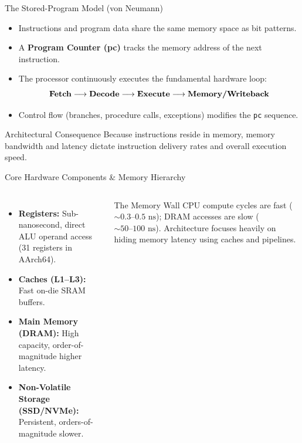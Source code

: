 \documentclass[aspectratio=169,11pt]{beamer}
\newcommand{\key}[1]{\textbf{#1}}
\newcommand{\bits}[1]{\texttt{#1}}
\begin{document}
\begin{frame}{The Stored-Program Model (von Neumann)}

\begin{itemize}
  \item Instructions and program data share the same memory space as bit patterns.
  \item A \key{Program Counter (pc)} tracks the memory address of the next instruction.
  \item The processor continuously executes the fundamental hardware loop:
        $$\text{\key{Fetch}} \longrightarrow \text{\key{Decode}} \longrightarrow \text{\key{Execute}} \longrightarrow \text{\key{Memory/Writeback}}$$
  \item Control flow (branches, procedure calls, exceptions) modifies the \bits{pc} sequence.
\end{itemize}

\begin{block}{Architectural Consequence}
Because instructions reside in memory, memory bandwidth and latency dictate instruction delivery rates and overall execution speed.
\end{block}

\end{frame}


\begin{frame}{Core Hardware Components \& Memory Hierarchy}

\begin{columns}[T,onlytextwidth]

\begin{itemize}
  \item \key{Registers:} Sub-nanosecond, direct ALU operand access (31 registers in AArch64).
  \item \key{Caches (L1--L3):} Fast on-die SRAM buffers.
  \item \key{Main Memory (DRAM):} High capacity, order-of-magnitude higher latency.
  \item \key{Non-Volatile Storage (SSD/NVMe):} Persistent, orders-of-magnitude slower.
\end{itemize}

\begin{block}{The Memory Wall}
CPU compute cycles are fast ($\sim 0.3\text{--}0.5\text{ ns}$); DRAM accesses are slow ($\sim 50\text{--}100\text{ ns}$). Architecture focuses heavily on hiding memory latency using caches and pipelines.
\end{block}

\end{columns}

\end{frame}
\end{document}
